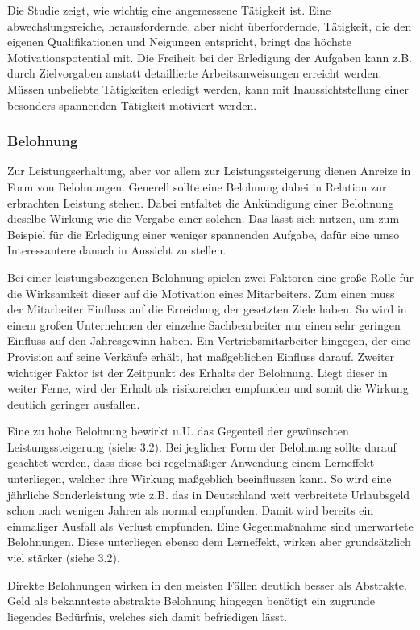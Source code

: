 Die Studie zeigt, wie wichtig eine angemessene Tätigkeit ist. Eine abwechslungsreiche, herausfordernde, aber nicht überfordernde, Tätigkeit, die den eigenen Qualifikationen und Neigungen entspricht, bringt das höchste Motivationspotential mit. 
Die Freiheit bei der Erledigung der Aufgaben kann z.B. durch Zielvorgaben anstatt detaillierte Arbeitsanweisungen erreicht werden. 
Müssen unbeliebte Tätigkeiten erledigt werden, kann mit Inaussichtstellung einer besonders spannenden Tätigkeit motiviert werden. 

\subsubsection{Belohnung}
Zur Leistungserhaltung, aber vor allem zur Leistungssteigerung dienen Anreize in Form von Belohnungen. Generell sollte eine Belohnung dabei in Relation zur erbrachten Leistung stehen. Dabei entfaltet die Ankündigung einer Belohnung dieselbe Wirkung wie die Vergabe einer solchen. Das lässt sich nutzen, um zum Beispiel für die Erledigung einer weniger spannenden Aufgabe, dafür eine umso Interessantere danach in Aussicht zu stellen. 

Bei einer leistungsbezogenen Belohnung spielen zwei Faktoren eine große Rolle für die Wirksamkeit dieser auf die Motivation eines Mitarbeiters. Zum einen muss der Mitarbeiter Einfluss auf die Erreichung der gesetzten Ziele haben. So wird in einem großen Unternehmen der einzelne Sachbearbeiter nur einen sehr geringen Einfluss auf den Jahresgewinn haben. Ein Vertriebsmitarbeiter hingegen, der eine Provision auf seine Verkäufe erhält, hat maßgeblichen Einfluss darauf.
Zweiter wichtiger Faktor ist der Zeitpunkt des Erhalts der Belohnung. Liegt dieser in weiter Ferne, wird der Erhalt als risikoreicher empfunden und somit die Wirkung deutlich geringer ausfallen.

Eine zu hohe Belohnung bewirkt u.U. das Gegenteil der gewünschten Leistungssteigerung (siehe 3.2). Bei jeglicher Form der Belohnung sollte darauf geachtet werden, dass diese bei regelmäßiger Anwendung einem Lerneffekt unterliegen, welcher ihre Wirkung maßgeblich beeinflussen kann. So wird eine jährliche Sonderleistung wie z.B. das in Deutschland weit verbreitete Urlaubsgeld schon nach wenigen Jahren als normal empfunden. Damit wird bereits ein einmaliger Ausfall als Verlust empfunden. Eine Gegenmaßnahme sind unerwartete Belohnungen. Diese unterliegen ebenso dem Lerneffekt, wirken aber grundsätzlich viel stärker (siehe 3.2). 

Direkte Belohnungen wirken in den meisten Fällen deutlich besser als Abstrakte. Geld als bekannteste abstrakte Belohnung hingegen benötigt ein zugrunde liegendes Bedürfnis, welches sich damit befriedigen lässt.

